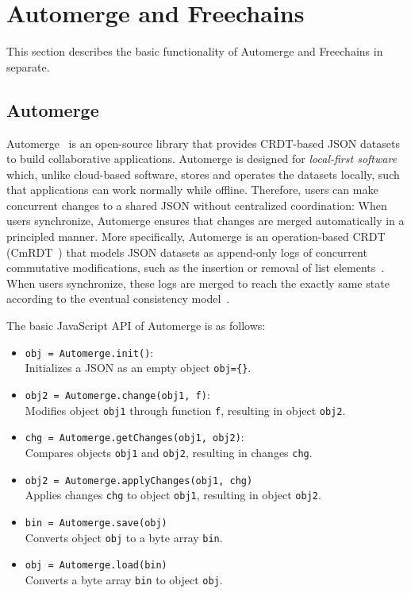 \documentclass[12pt]{article}
\begin{document}
\section{Automerge and Freechains}
\label{sec.both}

This section describes the basic functionality of Automerge and Freechains in
separate.

\subsection{Automerge}

Automerge~\cite{kleppmann2018automerge} is an open-source library that provides
CRDT-based JSON datasets to build collaborative applications.
%
Automerge is designed for \emph{local-first software}~\cite{TODO} which, unlike
cloud-based software, stores and operates the datasets locally, such that
applications can work normally while offline.
%
Therefore, users can make concurrent changes to a shared JSON without
centralized coordination:
When users synchronize, Automerge ensures that changes are merged automatically
in a principled manner.
%
More specifically, Automerge is an operation-based CRDT (CmRDT~\cite{TODO})
that models JSON datasets as append-only logs of concurrent commutative
modifications, such as the insertion or removal of list
elements~\cite{kleppmann2017conflict}.
%
When users synchronize, these logs are merged to reach the exactly same state
according to the eventual consistency model~\cite{TODO}.


The basic JavaScript API of Automerge is as follows:

\begin{itemize}
\item \texttt{obj = Automerge.init()}: \\
    Initializes a JSON as an empty object \texttt{obj=\{\}}.
\item \texttt{obj2 = Automerge.change(obj1, f)}: \\
    Modifies object \texttt{obj1} through function \texttt{f}, resulting in
    object \texttt{obj2}.
\item \texttt{chg = Automerge.getChanges(obj1, obj2)}: \\
    Compares objects \texttt{obj1} and \texttt{obj2}, resulting in changes
    \texttt{chg}.
\item \texttt{obj2 = Automerge.applyChanges(obj1, chg)} \\
    Applies changes \texttt{chg} to object \texttt{obj1}, resulting in object
    \texttt{obj2}.
\item \texttt{bin = Automerge.save(obj)} \\
    Converts object \texttt{obj} to a byte array \texttt{bin}.
\item \texttt{obj = Automerge.load(bin)} \\
    Converts a byte array \texttt{bin} to object \texttt{obj}.
\end{itemize}
\end{document}
